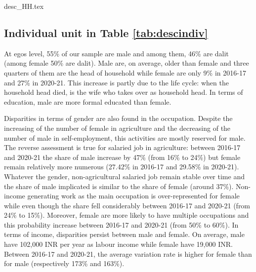 \documentclass[a4paper, 11pt, onecolumn]{article}
\begin{document}
{desc_HH.tex}

\subsection{Individual unit in Table \ref{tab:descindiv}}
At egos level, 55\% of our sample are male and among them, 46\% are dalit (among female 50\% are dalit).
Male are, on average, older than female and three quarters of them are the head of household while female are only 9\% in 2016-17 and 27\% in 2020-21.
This increase is partly due to the life cycle: when the household head died, is the wife who takes over as household head.
In terms of education, male are more formal educated than female.

Disparities in terms of gender are also found in the occupation.
Despite the increasing of the number of female in agriculture and the decreasing of the number of male in self-employment, this activities are mostly reserved for male.
The reverse assessment is true for salaried job in agriculture: between 2016-17 and 2020-21 the share of male increase by 47\% (from 16\% to 24\%) but female remain relatively more numerous (27.42\% in 2016-17 and 29.58\% in 2020-21). 
Whatever the gender, non-agricultural salaried job remain stable over time and the share of male implicated is similar to the share of female (around 37\%).
Non-income generating work as the main occupation is over-represented for female while even though the share fell considerably between 2016-17 and 2020-21 (from 24\% to 15\%).
Moreover, female are more likely to have multiple occupations and this probability increase between 2016-17 and 2020-21 (from 50\% to 60\%).
In terms of income, disparities persist between male and female.
On average, male have 102,000 INR per year as labour income while female have 19,000 INR.
Between 2016-17 and 2020-21, the average variation rate is higher for female than for male (respectively 173\% and 163\%).
\end{document}

